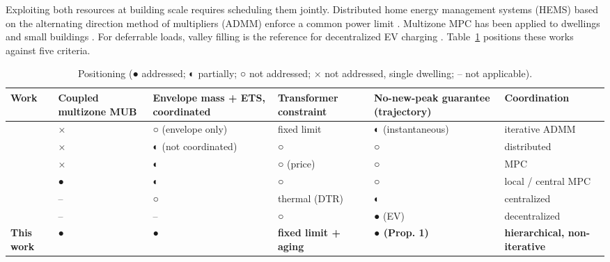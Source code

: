 \documentclass[conference]{IEEEtran}
\begin{document}
Exploiting both resources at building scale requires scheduling them jointly. Distributed home energy management systems (HEMS) based on the alternating direction method of multipliers (ADMM) enforce a common power limit \cite{Etedadi2023}. Multizone MPC has been applied to dwellings and small buildings \cite{Frahm2025, Hasrat2025}. For deferrable loads, valley filling is the reference for decentralized EV charging \cite{Gan2013}. Table~\ref{tab:I} positions these works against five criteria.

\begin{table}[tb]
\centering\footnotesize
\caption{Positioning (● addressed; ◐ partially; ○ not addressed; × not addressed, single dwelling; -- not applicable).}\label{tab:I}
\begin{tabular}{>{\raggedright\arraybackslash}p{}>{\raggedright\arraybackslash}p{}>{\raggedright\arraybackslash}p{}>{\raggedright\arraybackslash}p{}>{\raggedright\arraybackslash}p{}>{\raggedright\arraybackslash}p{}}
\toprule
\textbf{Work} & \textbf{Coupled multizone MUB} & \textbf{Envelope mass + ETS, coordinated} & \textbf{Transformer constraint} & \textbf{No-new-peak guarantee (trajectory)} & \textbf{Coordination} \\
\midrule
\cite{Etedadi2023} & × & ○ (envelope only) & fixed limit & ◐ (instantaneous) & iterative ADMM \\
\cite{EtedadiAliabadi2022} & × & ◐ (not coordinated) & ○ & ○ & distributed \\
\cite{Vallianos2023} & × & ◐ & ○ (price) & ○ & MPC \\
\cite{Frahm2025, Hasrat2025} & ● & ◐ & ○ & ○ & local / central MPC \\
\cite{Daminov2021} & -- & ○ & thermal (DTR) & ◐ & centralized \\
\cite{Gan2013} & -- & -- & ○ & ● (EV) & decentralized \\
\textbf{This work} & \textbf{●} & \textbf{●} & \textbf{fixed limit + aging} & \textbf{● (Prop. 1)} & \textbf{hierarchical, non-iterative} \\
\bottomrule
\end{tabular}
\end{table}
\end{document}
